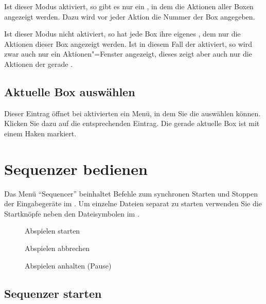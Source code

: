 Ist dieser Modus aktiviert, so gibt es nur ein
, in dem die Aktionen aller
Boxen angezeigt werden. Dazu wird vor jeder Aktion die Nummer der Box
angegeben.


Ist dieser Modus nicht aktiviert, so hat jede Box ihre eigenes
, dem nur die Aktionen
dieser Box angezeigt werden. Ist in diesem Fall der
aktiviert, so wird zwar
auch nur ein Aktionen"=Fenster angezeigt, dieses zeigt aber auch nur
die Aktionen der gerade .


\subsection{Aktuelle Box auswählen}
\label{sec:MI_SELECTBOX}

Dieser Eintrag öffnet bei aktivierten
 ein Menü, in dem Sie die
 auswählen können. Klicken
Sie dazu auf die entsprechenden Eintrag. Die gerade aktuelle Box ist
mit einem Haken markiert.


\section{Sequenzer bedienen}\label{sec:MS_SEQUENCER}
Das Menü "`Sequencer"' beinhaltet Befehle zum synchronen Starten 
und Stoppen der Eingabegeräte im . 
Um einzelne Dateien separat zu starten verwenden Sie die Startknöpfe 
neben den Dateisymbolen im  .

\begin{description}
\item[] Abspielen starten
\item[] Abspielen abbrechen
\item[] Abspielen anhalten (Pause)
\end{description}

\subsection{Sequenzer starten}
\label{sec:MI_INDEVPLAY}


